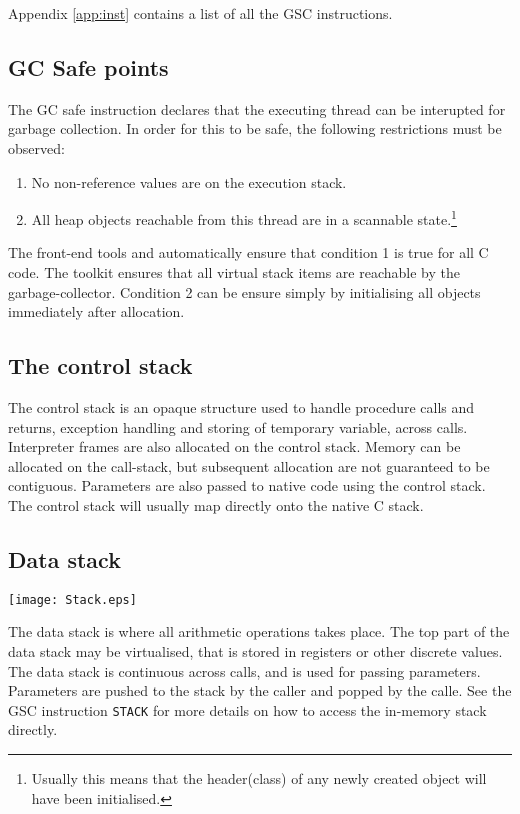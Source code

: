 Appendix \ref{app:inst} contains a list of all the GSC instructions.

\subsection{GC Safe points}
The GC safe instruction declares that the executing thread can be interupted for garbage collection. In order for this to be safe, the following restrictions must be observed:
\begin{enumerate}
\item No non-reference values are on the execution stack.
\item All heap objects reachable from this thread are in a scannable state.\footnote{Usually this means that the header(class) of any newly created object will have been initialised.}
\end{enumerate}
The front-end tools \gvmtc{} and \gvmtic{} automatically ensure that condition 1 is true for all C code.
The toolkit ensures that all virtual stack items are reachable by the garbage-collector.
Condition 2 can be ensure simply by initialising all objects immediately after allocation.

\subsection{The control stack}
The control stack is an opaque structure used to handle procedure calls and returns, exception handling and storing of temporary variable, across calls. Interpreter frames are also allocated on the control stack. Memory can be allocated on the call-stack, but subsequent allocation are not guaranteed to be contiguous. Parameters are also passed to native code using the control stack.
The control stack will usually map directly onto the native C stack.

\subsection{Data stack}

        \begin{center}
        \texttt{[image: Stack.eps]}
        \end{center}


The data stack is where all arithmetic operations takes place. The top part of the data stack may be virtualised, that is stored in registers or other discrete values. The data stack is continuous across calls, and is used for passing parameters. Parameters are pushed to the stack by the caller and popped by the calle. See the GSC instruction \verb|STACK| for more details on how to access the in-memory stack directly.

